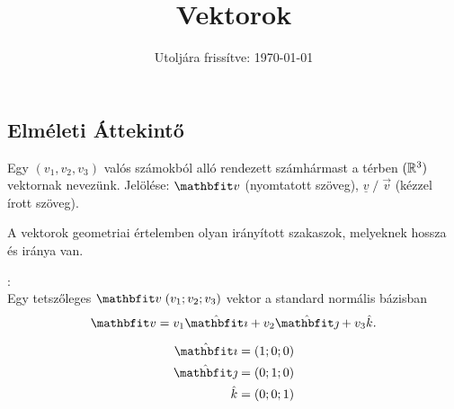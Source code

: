 \documentclass[a4paper, 12pt]{scrartcl}
\title{Vektorok}
\date{Utoljára frissítve: \today}
\begin{document}
\maketitle

\subsection{Elméleti Áttekintő}

\begin{definition}[Vektor]
  Egy $(v_1, v_2, v_3)$ valós számokból alló rendezett számhármast a térben
  $(\mathbb{R}^3)$ vektornak nevezünk. Jelölése: $\rvec v$ (nyomtatott szöveg),
  $\underline v \; / \; \vec v$ (kézzel írott szöveg).
\end{definition}

\begin{note}
  A vektorok geometriai értelemben olyan irányított szakaszok, melyeknek
  hossza és iránya van.
\end{note}

\begin{blueBox}
  \begin{minipage}{.45\textwidth}
    :\\[3mm]
    Egy tetszőleges $\rvec v \; (v_1; v_2; v_3)$ vektor a standard normális
    bázisban
    \[
      \rvec v = v_1 \ibase + v_2 \jbase + v_3 \kbase
      \text.
    \]
  \end{minipage}\begin{minipage}{.25\textwidth}
    \begin{center}
    \end{center}
  \end{minipage}\begin{minipage}{.30\textwidth}
    \begin{align*}
      \ibase & = (1; 0; 0) \\
      \jbase & = (0; 1; 0) \\
      \kbase & = (0; 0; 1)
    \end{align*}
  \end{minipage}
\end{blueBox}
\end{document}
